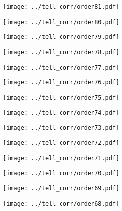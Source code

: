 \documentclass{article}
\begin{document}
\begin{figure}[H]
    \centering
    \texttt{[image: ../tell\_corr/order81.pdf]}
\end{figure}
\begin{figure}[H]
    \centering
    \texttt{[image: ../tell\_corr/order80.pdf]}
\end{figure}
\begin{figure}[H]
    \centering
    \texttt{[image: ../tell\_corr/order79.pdf]}
\end{figure}
\begin{figure}[H]
    \centering
    \texttt{[image: ../tell\_corr/order78.pdf]}
\end{figure}
\begin{figure}[H]
    \centering
    \texttt{[image: ../tell\_corr/order77.pdf]}
\end{figure}
\begin{figure}[H]
    \centering
    \texttt{[image: ../tell\_corr/order76.pdf]}
\end{figure}
\begin{figure}[H]
    \centering
    \texttt{[image: ../tell\_corr/order75.pdf]}
\end{figure}
\begin{figure}[H]
    \centering
    \texttt{[image: ../tell\_corr/order74.pdf]}
\end{figure}
\begin{figure}[H]
    \centering
    \texttt{[image: ../tell\_corr/order73.pdf]}
\end{figure}
\begin{figure}[H]
    \centering
    \texttt{[image: ../tell\_corr/order72.pdf]}
\end{figure}
\begin{figure}[H]
    \centering
    \texttt{[image: ../tell\_corr/order71.pdf]}
\end{figure}
\begin{figure}[H]
    \centering
    \texttt{[image: ../tell\_corr/order70.pdf]}
\end{figure}
\begin{figure}[H]
    \centering
    \texttt{[image: ../tell\_corr/order69.pdf]}
\end{figure}
\begin{figure}[H]
    \centering
    \texttt{[image: ../tell\_corr/order68.pdf]}
\end{figure}
\end{document}
